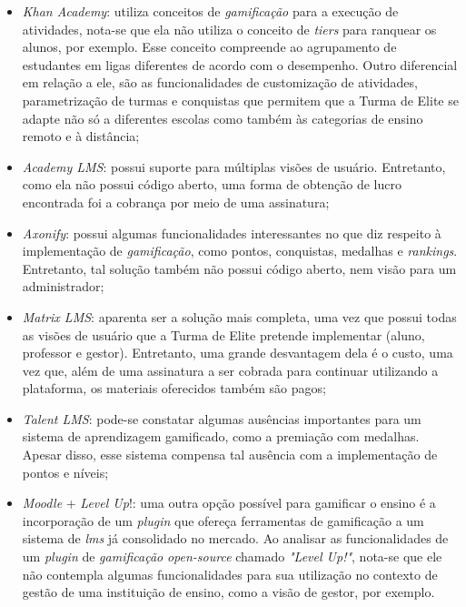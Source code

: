\documentclass[
    12pt,               %
    openright,          %
    oneside,
    a4paper,            %
    english,            %
    brazil              %
    ]{ifsp-spo-inf-ctds} %
\begin{document}
\begin{itemize}

\item {\textit{Khan Academy}:} utiliza conceitos de \textit{gamificação} para a execução de atividades, nota-se que ela não utiliza o conceito de \textit{\glspl{tier}} para ranquear os alunos, por exemplo. Esse conceito compreende ao agrupamento de estudantes em ligas diferentes de acordo com o desempenho. Outro diferencial em relação a ele, são as funcionalidades de customização de atividades, parametrização de turmas e conquistas que permitem que a Turma de Elite se adapte não só a diferentes escolas como também às categorias de ensino remoto e à distância;

\item {\textit{Academy LMS}:} possui suporte para múltiplas visões de usuário.
Entretanto, como ela não possui código aberto, uma forma de obtenção de lucro encontrada foi a cobrança por meio de uma assinatura;

\item{\textit{Axonify}:} possui algumas funcionalidades interessantes no que diz respeito à implementação de \textit{gamificação}, como pontos, conquistas, medalhas e \textit{\glspl{ranking}}. Entretanto, tal solução também não possui código aberto, nem visão para um administrador;

\item{\textit{Matrix LMS}:} aparenta ser a solução mais completa, uma vez que possui todas as visões de usuário que a Turma de Elite pretende implementar (aluno, professor e gestor). Entretanto, uma grande desvantagem dela é o custo, uma vez que, além de uma assinatura a ser cobrada para continuar utilizando a plataforma, os materiais oferecidos também são pagos;

\item{\textit{Talent LMS}:} pode-se constatar algumas ausências importantes para um sistema de aprendizagem gamificado, como a premiação com medalhas. Apesar disso, esse sistema compensa tal ausência com a implementação de pontos e níveis;


\item{\textit{Moodle} + \textit{Level Up}!:} uma outra opção possível para gamificar o ensino é a incorporação de um \textit{\gls{plugin}} que ofereça ferramentas de gamificação a um sistema de \textit{\ac{lms}} já consolidado no mercado. Ao analisar as funcionalidades de um \textit{\gls{plugin}} de \textit{gamificação} \textit{\gls{open-source}} chamado \textit{"Level Up!"}, nota-se que ele não contempla algumas funcionalidades para sua utilização no contexto de gestão de uma instituição de ensino, como a visão de gestor, por exemplo.

\end{itemize}
\end{document}
